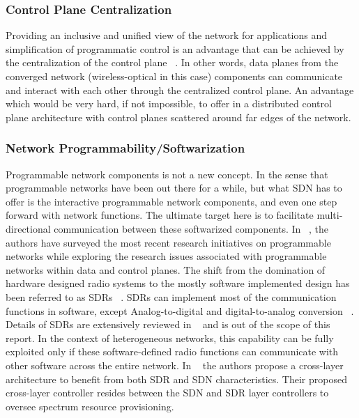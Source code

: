 \subsubsection{Control Plane Centralization}

Providing an inclusive and unified view of the network for applications and simplification of programmatic control is an advantage that can be achieved by the centralization of the control plane ~\cite{D.:2013:SSD:2566940}. In other words, data planes from the converged network (wireless-optical in this case) components can communicate and interact with each other through the centralized control plane. An advantage which would be very hard, if not impossible, to offer in a distributed control plane architecture with control planes scattered around far edges of the network.

\subsubsection{Network Programmability/Softwarization}

Programmable network components is not a new concept. In the sense that programmable networks have been out there for a while, but what \ac{SDN} has to offer is the interactive programmable network components, and even one step forward with network functions. The ultimate target here is to facilitate multi-directional communication between these softwarized components. In ~\cite{Macedo2015}, the authors have surveyed the most recent research initiatives on programmable networks while exploring the research issues associated with programmable networks within data and control planes.
The shift from the domination of hardware designed radio systems to the mostly software implemented design has been referred to as \acp{SDR} ~\cite{267870}. \acp{SDR} can implement most of the communication functions in software, except Analog-to-digital and digital-to-analog conversion ~\cite{Macedo2015}. Details of \acp{SDR} are extensively reviewed in ~\cite{5462981,Macedo2015} and is out of the scope of this report. In the context of heterogeneous networks, this capability can be fully exploited only if these software-defined radio functions can communicate with other software across the entire network. In ~\cite{6895241} the authors propose a cross-layer architecture to benefit from both \ac{SDR} and \ac{SDN} characteristics. Their proposed cross-layer controller resides between the \ac{SDN} and \ac{SDR} layer controllers to oversee spectrum resource provisioning.

